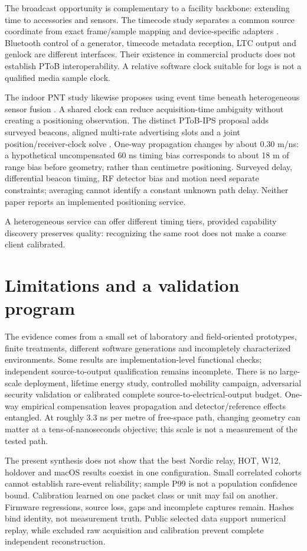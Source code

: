 \documentclass[11pt,letterpaper]{article}
\begin{document}
The broadcast opportunity is complementary to a facility backbone: extending time to accessories and sensors. The timecode study separates a common source coordinate from exact frame/sample mapping and device-specific adapters \cite{timecode}. Bluetooth control of a generator, timecode metadata reception, LTC output and genlock are different interfaces. Their existence in commercial products does not establish PToB interoperability. A relative software clock suitable for logs is not a qualified media sample clock.

The indoor PNT study likewise proposes using event time beneath heterogeneous sensor fusion \cite{pnt}. A shared clock can reduce acquisition-time ambiguity without creating a positioning observation. The distinct PToB-IPS proposal adds surveyed beacons, aligned multi-rate advertising slots and a joint position/receiver-clock solve \cite{ips}. One-way propagation changes by about 0.30 m/ns: a hypothetical uncompensated 60 ns timing bias corresponds to about 18 m of range bias before geometry, rather than centimetre positioning. Surveyed delay, differential beacon timing, RF detector bias and motion need separate constraints; averaging cannot identify a constant unknown path delay. Neither paper reports an implemented positioning service.

A heterogeneous service can offer different timing tiers, provided capability discovery preserves quality: recognizing the same root does not make a coarse client calibrated.

\section{Limitations and a validation program}
The evidence comes from a small set of laboratory and field-oriented prototypes, finite treatments, different software generations and incompletely characterized environments. Some results are implementation-level functional checks; independent source-to-output qualification remains incomplete. There is no large-scale deployment, lifetime energy study, controlled mobility campaign, adversarial security validation or calibrated complete source-to-electrical-output budget. One-way empirical compensation leaves propagation and detector/reference effects entangled. At roughly 3.3 ns per metre of free-space path, changing geometry can matter at a tens-of-nanoseconds objective; this scale is not a measurement of the tested path.

The present synthesis does not show that the best Nordic relay, HOT, W12, holdover and macOS results coexist in one configuration. Small correlated cohorts cannot establish rare-event reliability; sample P99 is not a population confidence bound. Calibration learned on one packet class or unit may fail on another. Firmware regressions, source loss, gaps and incomplete captures remain. Hashes bind identity, not measurement truth. Public selected data support numerical replay, while excluded raw acquisition and calibration prevent complete independent reconstruction.
\end{document}
